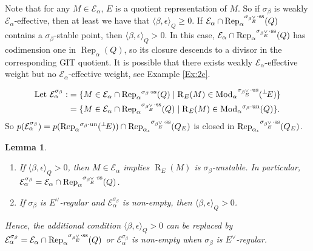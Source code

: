 \documentclass{amsart}
\newtheorem{lemma}[theorem]{Lemma}
\theoremstyle{definition}
\theoremstyle{remark}
\numberwithin{equation}{section}
\begin{document}
Note that for any $M\in{\mathcal{{E}}}_\alpha$, $E$ is a quotient representation of $M$. So if $\sigma_\beta$ is weakly ${\mathcal{{E}}}_\alpha$-effective, then at least we have that ${\langle{\beta,\epsilon}\rangle}_Q\geqslant 0$. If ${\mathcal{{E}}}_\alpha\cap{\operatorname{Rep}}_\alpha{^{\sigma_{{\beta_E^\vee}}\cdot{\rm {ss}}}}(Q)$ contains a $\sigma_\beta$-stable point, then ${\langle{\beta,\epsilon}\rangle}_Q>0$. In this case, ${\mathcal{{E}}}_\alpha\cap{\operatorname{Rep}}_\alpha{^{\sigma_{{\beta_E^\vee}}\cdot{\rm {ss}}}}(Q)$ has codimension one in ${\operatorname{Rep}}_\alpha(Q)$, so its closure descends to a divisor in the corresponding GIT quotient.
It is possible that there exists weakly ${\mathcal{{E}}}_\alpha$-effective weight but no ${\mathcal{{E}}}_\alpha$-effective weight, see Example \ref{Ex:2c}.

\begin{align*}\text{Let }{\mathcal{{E}}}_\alpha^{\sigma_\beta}:&=\{M\in {\mathcal{{E}}}_\alpha\cap{\operatorname{Rep}}_\alpha{^{\sigma_{{\beta}}\cdot{\rm {ss}}}}(Q)\mid {\operatorname{R}}_E(M)\in {\operatorname{Mod}}_\alpha{^{\sigma_{{\beta_E^\vee}}\cdot{\rm {us}}}}({{^\perp}\!} E)\} \\
& =\{M\in {\mathcal{{E}}}_\alpha\cap{\operatorname{Rep}}_\alpha{^{\sigma_{{\beta_E^\vee}}\cdot{\rm {ss}}}}(Q)\mid {\operatorname{R}}_E(M)\in {\operatorname{Mod}}_\alpha{^{\sigma_{{\beta}}\cdot{\rm {un}}}}(Q)\}.
\end{align*}
So $p({\mathcal{{E}}}_\alpha^{\sigma_\beta})=p({\operatorname{Rep}}_\alpha{^{\sigma_{{\beta}}\cdot{\rm {un}}}}({{^\perp}\!} E))\cap{\operatorname{Rep}}_{\alpha_\epsilon}{^{\sigma_{{\beta_E^\vee}}\cdot{\rm {ss}}}}(Q_E)$ is closed in ${\operatorname{Rep}}_{\alpha_\epsilon}{^{\sigma_{{\beta_E^\vee}}\cdot{\rm {ss}}}}(Q_E)$.

\begin{lemma} \label{L:positive} {\ } \begin{enumerate}
\item[(i)] If ${\langle{\beta,\epsilon}\rangle}_Q>0$, then $M\in{\mathcal{{E}}}_\alpha$ implies ${\operatorname{R}}_E(M)$ is $\sigma_\beta$-unstable. In particular, ${\mathcal{{E}}}_\alpha^{\sigma_\beta}={\mathcal{{E}}}_\alpha\cap{\operatorname{Rep}}_\alpha{^{\sigma_{{\beta_E^\vee}}\cdot{\rm {ss}}}}(Q)$.
\item[(ii)]  If $\sigma_\beta$ is $E^\vee$-regular and ${\mathcal{{E}}}_\alpha^{\sigma_\beta}$ is non-empty, then ${\langle{\beta,\epsilon}\rangle}_Q>0$. \end{enumerate}
Hence, the additional condition ${\langle{\beta,\epsilon}\rangle}_Q>0$ can be replaced by ${\mathcal{{E}}}_\alpha^{\sigma_\beta}={\mathcal{{E}}}_\alpha\cap{\operatorname{Rep}}_\alpha{^{\sigma_{{\beta_E^\vee}}\cdot{\rm {ss}}}}(Q)$ or ${\mathcal{{E}}}_\alpha^{\sigma_\beta}$ is non-empty when $\sigma_\beta$ is $E^\vee$-regular.
\end{lemma}
\end{document}
